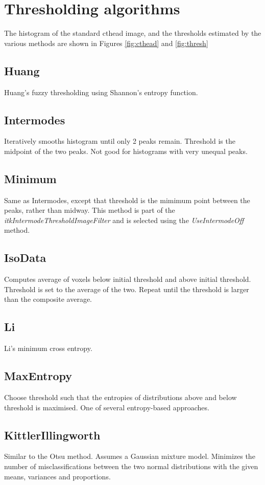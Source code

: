 \documentclass{InsightArticle}
\begin{document}
\section{Thresholding algorithms}
The histogram of the standard cthead image, and the thresholds
estimated by the various methods are shown in Figures \ref{fig:cthead}
and \ref{fig:thresh}
\subsection{Huang}
Huang's fuzzy thresholding using Shannon's entropy function.
\subsection{Intermodes}
Iteratively smooths histogram until only 2 peaks remain. Threshold is
the midpoint of the two peaks. Not good for histograms with very
unequal peaks.
\subsection{Minimum}
Same as Intermodes, except that threshold is the mimimum point between
the peaks, rather than midway. This method is part of the {\em
  itkIntermodeThresholdImageFilter} and is selected using the
{\em UseIntermodeOff} method.
\subsection{IsoData}
Computes average of voxels below initial threshold and above initial
threshold. Threshold is set to the average of the two. Repeat until
the threshold is larger than the composite average.

\subsection{Li}
Li's minimum cross entropy.
\subsection{MaxEntropy}
Choose threshold such that the entropies of distributions above and
below threshold is maximised. One of several entropy-based approaches.

\subsection{KittlerIllingworth}
Similar to the Otsu method. Assumes a Gaussian mixture
model. Minimizes the number of misclassifications between the two
normal distributions with the given means, variances and proportions.
\end{document}
